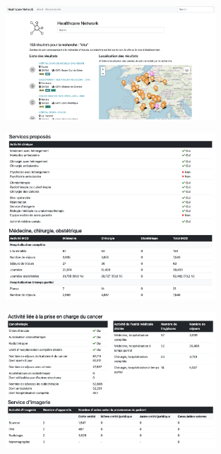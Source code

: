 \begin{figure}[h]
    \includegraphics[width=0.7\textwidth]{images/healthcare-network/search.png}
    \centering
    \caption{}
    \label{fig:hn-search}
\end{figure}


\begin{figure}[h]
    \includegraphics[width=0.7\textwidth]{images/healthcare-network/curie-services.png}
    \centering
    \caption{}
    \label{fig:hn-curie-services}
\end{figure}


\begin{figure}[h]
    \includegraphics[width=0.7\textwidth]{images/healthcare-network/curie-cancero.png}
    \centering
    \caption{}
    \label{fig:hn-curie-cancero}
\end{figure}


